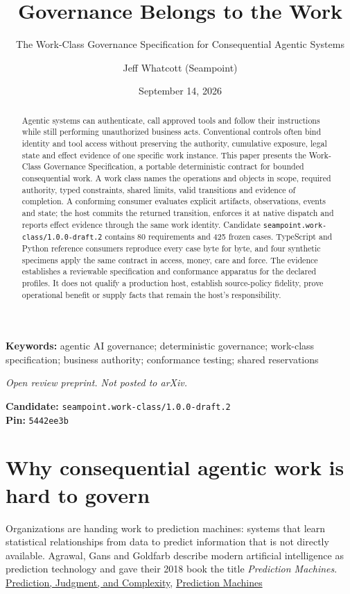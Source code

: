 \documentclass[
  american,
  11pt,
  letterpaper,
]{article}
\title{Governance Belongs to the Work}
\subtitle{The Work-Class Governance Specification for Consequential
Agentic Systems}
\author{Jeff Whatcott (Seampoint)}
\date{September 14, 2026}
\newcommand{\passthrough}[1]{#1}
\begin{document}
\maketitle
\begin{abstract}
Agentic systems can authenticate, call approved tools and follow their
instructions while still performing unauthorized business acts.
Conventional controls often bind identity and tool access without
preserving the authority, cumulative exposure, legal state and effect
evidence of one specific work instance. This paper presents the
Work-Class Governance Specification, a portable deterministic contract
for bounded consequential work. A work class names the operations and
objects in scope, required authority, typed constraints, shared limits,
valid transitions and evidence of completion. A conforming consumer
evaluates explicit artifacts, observations, events and state; the host
commits the returned transition, enforces it at native dispatch and
reports effect evidence through the same work identity. Candidate
\passthrough{\lstinline!seampoint.work-class/1.0.0-draft.2!} contains 80
requirements and 425 frozen cases. TypeScript and Python reference
consumers reproduce every case byte for byte, and four synthetic
specimens apply the same contract in access, money, care and force. The
evidence establishes a reviewable specification and conformance
apparatus for the declared profiles. It does not qualify a production
host, establish source-policy fidelity, prove operational benefit or
supply facts that remain the host's responsibility.
\end{abstract}

\textbf{Keywords:} agentic AI governance; deterministic governance;
work-class specification; business authority; conformance testing;
shared reservations

\emph{Open review preprint. Not posted to arXiv.}

\textbf{Candidate:}
\passthrough{\lstinline!seampoint.work-class/1.0.0-draft.2!}\\
\textbf{Pin:} \passthrough{\lstinline!5442ee3b!}

\section{Why consequential agentic work is hard to
govern}\label{why-consequential-agentic-work-is-hard-to-govern}

Organizations are handing work to prediction machines: systems that
learn statistical relationships from data to predict information that is
not directly available. Agrawal, Gans and Goldfarb describe modern
artificial intelligence as prediction technology and gave their 2018
book the title \emph{Prediction Machines}.
\href{https://www.nber.org/papers/w24243}{Prediction, Judgment, and
Complexity}, \href{https://www.predictionmachines.ai/}{Prediction
Machines}
\end{document}
